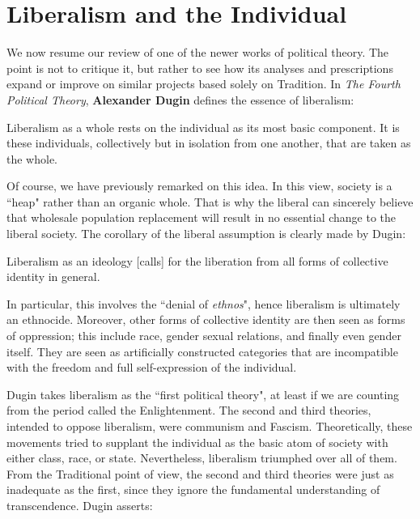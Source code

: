 \section{Liberalism and the Individual}

We now resume our review of one of the newer works of political theory. The point is not to critique it, but rather to
see how its analyses and prescriptions expand or improve on similar projects based solely on Tradition. In \textit{The Fourth
Political Theory}, \textbf{Alexander Dugin} defines the essence of liberalism:

\begin{quotex}
Liberalism as a whole rests on the individual as its most basic component. It is these individuals, collectively but in
isolation from one another, that are taken as the whole. 

\end{quotex}
Of course, we have previously remarked on this idea. In this view, society is a ``heap" rather than an organic whole.
That is why the liberal can sincerely believe that wholesale population replacement will result in no essential change
to the liberal society. The corollary of the liberal assumption is clearly made by Dugin:

\begin{quotex}
Liberalism as an ideology [calls] for the liberation from all forms of collective identity in general. 

\end{quotex}
In particular, this involves the ``denial of \emph{ethnos}", hence liberalism is ultimately an ethnocide. Moreover, other
forms of collective identity are then seen as forms of oppression; this include race, gender sexual relations, and
finally even gender itself. They are seen as artificially constructed categories that are incompatible with the freedom
and full self-expression of the individual.

Dugin takes liberalism as the ``first political theory", at least if we are counting from the period called the
Enlightenment. The second and third theories, intended to oppose liberalism, were communism and Fascism. Theoretically,
these movements tried to supplant the individual as the basic atom of society with either class, race, or state.
Nevertheless, liberalism triumphed over all of them. From the Traditional point of view, the second and third theories
were just as inadequate as the first, since they ignore the fundamental understanding of transcendence. Dugin asserts:

